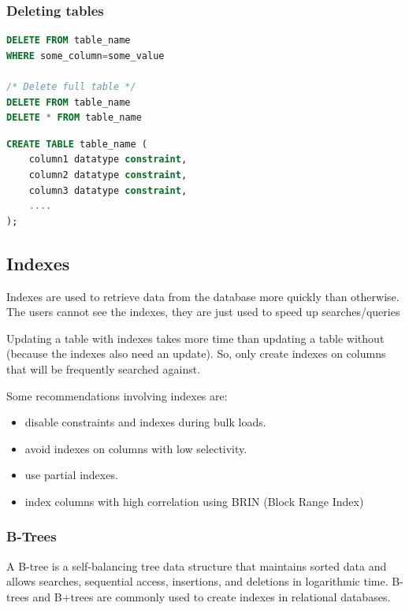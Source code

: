 \documentclass{article}
\begin{document}
\subsubsection{Deleting tables}

\vspace{8pt} \begin{lstlisting}[language=SQL]
DELETE FROM table_name
WHERE some_column=some_value

/* Delete full table */
DELETE FROM table_name
DELETE * FROM table_name
\end{lstlisting} \vspace{8pt}



\vspace{8pt} \begin{lstlisting}[language=SQL]
CREATE TABLE table_name (
    column1 datatype constraint,
    column2 datatype constraint,
    column3 datatype constraint,
    ....
);
\end{lstlisting} \vspace{8pt}


\subsection{Indexes}
Indexes are used to retrieve data from the database more quickly than otherwise. The users cannot see the indexes, they are just used to speed up searches/queries

Updating a table with indexes takes more time than updating a table without (because the indexes also need an update). So, only create indexes on columns that will be frequently searched against.

Some recommendations involving indexes are:
\begin{itemize}
    \item disable constraints and indexes during bulk loads.
    \item avoid indexes on columns with low selectivity.
    \item use partial indexes.
    \item index columns with high correlation using BRIN (Block Range Index)
\end{itemize}

\subsubsection{B-Trees}
A B-tree is a self-balancing tree data structure that maintains sorted data and allows searches, sequential access, insertions, and deletions in logarithmic time. B-trees and B+trees are commonly used to create indexes in relational databases.
\end{document}
